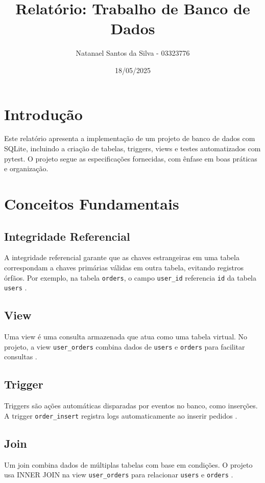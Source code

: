 \documentclass[a4paper,12pt]{article}
\title{Relatório: Trabalho de Banco de Dados}
\author{Natanael Santos da Silva - 03323776}
\date{18/05/2025}
\begin{document}
\maketitle

\section{Introdução}
Este relatório apresenta a implementação de um projeto de banco de dados com SQLite, incluindo a criação de tabelas, triggers, views e testes automatizados com pytest. O projeto segue as especificações fornecidas, com ênfase em boas práticas e organização.

\section{Conceitos Fundamentais}

\subsection{Integridade Referencial}
A integridade referencial garante que as chaves estrangeiras em uma tabela correspondam a chaves primárias válidas em outra tabela, evitando registros órfãos. Por exemplo, na tabela \texttt{orders}, o campo \texttt{user\_id} referencia \texttt{id} da tabela \texttt{users} \cite{elm}.

\subsection{View}
Uma view é uma consulta armazenada que atua como uma tabela virtual. No projeto, a view \texttt{user\_orders} combina dados de \texttt{users} e \texttt{orders} para facilitar consultas \cite{elm}.

\subsection{Trigger}
Triggers são ações automáticas disparadas por eventos no banco, como inserções. A trigger \texttt{order\_insert} registra logs automaticamente ao inserir pedidos \cite{elm}.

\subsection{Join}
Um join combina dados de múltiplas tabelas com base em condições. O projeto usa INNER JOIN na view \texttt{user\_orders} para relacionar \texttt{users} e \texttt{orders} \cite{elm}.
\end{document}
